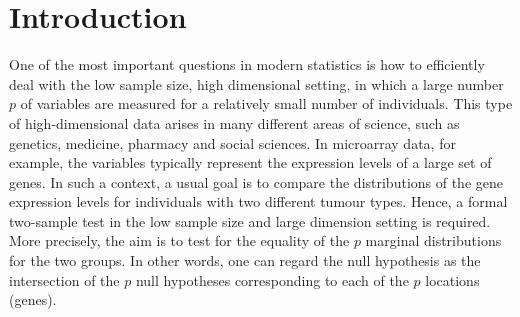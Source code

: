 \section{Introduction}\label{se:intro}


One of the most important questions in modern statistics is how to efficiently deal with the low sample size, high dimensional setting, in which a large number $p$ of variables are measured for a relatively small number of individuals. This type of high-dimensional data arises in many different areas of
science, such as genetics, medicine, pharmacy and social sciences. In microarray data, for example, the variables typically represent the expression levels
of a large set of genes. In such a context, a usual goal is to compare the distributions of the gene expression levels for individuals with two different tumour types. Hence, a formal two-sample test in the 
low sample size and large dimension setting is required. More precisely, the aim is to test for the equality of the
$p$ marginal distributions for the two groups. In other words, one can regard the null hypothesis as the intersection of the $p$ null hypotheses
corresponding to each of the $p$ locations (genes).

